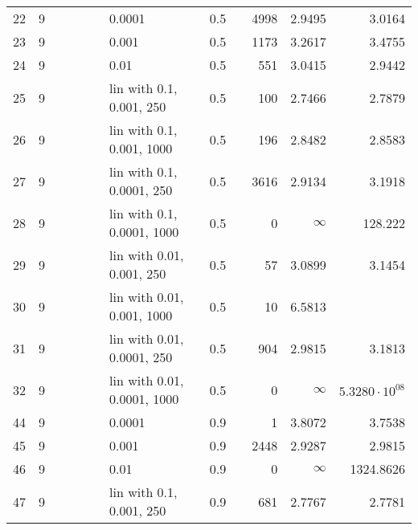 \begin{longtable}{lrrrrrlrrrrr}
  22 &       9 &   &   &   &   &                      0.0001 &  0.5 &        &    4998 &                 2.9495 &                 3.0164 \\
  23 &       9 &   &   &   &   &                       0.001 &  0.5 &        &    1173 &                 3.2617 &                 3.4755 \\
  24 &       9 &   &   &   &   &                        0.01 &  0.5 &        &     551 &                 3.0415 &                 2.9442 \\
  25 &       9 &   &   &   &   &    lin with 0.1, 0.001, 250 &  0.5 &        &     100 &                 2.7466 &                 2.7879 \\
  26 &       9 &   &   &   &   &   lin with 0.1, 0.001, 1000 &  0.5 &        &     196 &                 2.8482 &                 2.8583 \\
  27 &       9 &   &   &   &   &   lin with 0.1, 0.0001, 250 &  0.5 &        &    3616 &                 2.9134 &                 3.1918 \\
  28 &       9 &   &   &   &   &  lin with 0.1, 0.0001, 1000 &  0.5 &        &       0 &               $\infty$ &                128.222 \\
  29 &       9 &   &   &   &   &   lin with 0.01, 0.001, 250 &  0.5 &        &      57 &                 3.0899 &                 3.1454 \\
  30 &       9 &   &   &   &   &  lin with 0.01, 0.001, 1000 &  0.5 &        &      10 &                 6.5813 &                        \\
  31 &       9 &   &   &   &   &  lin with 0.01, 0.0001, 250 &  0.5 &        &     904 &                 2.9815 &                 3.1813 \\
  32 &       9 &   &   &   &   & lin with 0.01, 0.0001, 1000 &  0.5 &        &       0 &               $\infty$ &  $5.3280\cdot 10^{08}$ \\
  44 &       9 &   &   &   &   &                      0.0001 &  0.9 &        &       1 &                 3.8072 &                 3.7538 \\
  45 &       9 &   &   &   &   &                       0.001 &  0.9 &        &    2448 &                 2.9287 &                 2.9815 \\
  46 &       9 &   &   &   &   &                        0.01 &  0.9 &        &       0 &               $\infty$ &              1324.8626 \\
  47 &       9 &   &   &   &   &    lin with 0.1, 0.001, 250 &  0.9 &        &     681 &                 2.7767 &                 2.7781 \\

\end{longtable}
